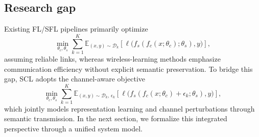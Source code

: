 \documentclass[10pt,journal]{IEEEtran}
\begin{document}
\subsection{Research gap}
Existing FL/SFL pipelines primarily optimize
\begin{equation}
\min_{\theta_c,\theta_s}\sum_{k=1}^{K}\mathbb{E}_{(x,y)\sim\mathcal{D}_k}\left[\ell\big(f_s(f_c(x;\theta_c);\theta_s),y\big)\right],
\end{equation}
assuming reliable links\cite{9060868,thapa2022splitfedfederatedlearningmeets}, whereas wireless-learning methods emphasize communication efficiency without explicit semantic preservation\cite{8736011,9042352}.
To bridge this gap, SCL adopts the channel-aware objective
\begin{equation}
\min_{\theta_c,\theta_s}\sum_{k=1}^{K}\mathbb{E}_{(x,y)\sim\mathcal{D}_k,\,\epsilon_k}\left[\ell\big(f_s(f_c(x;\theta_c)+\epsilon_k;\theta_s),y\big)\right],
\end{equation}
which jointly models representation learning and channel perturbations through semantic transmission.
In the next section, we formalize this integrated perspective through a unified system model.
\end{document}

